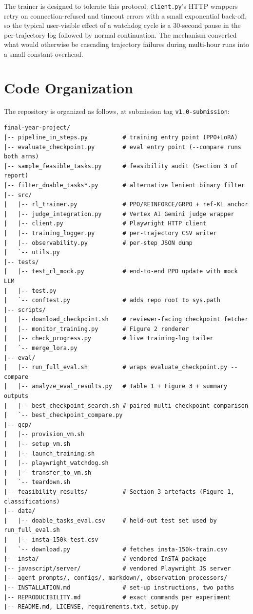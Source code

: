 \documentclass[12pt,a4paper]{report}
\begin{document}
The trainer is designed to tolerate this protocol: \texttt{client.py}'s HTTP wrappers retry on connection-refused and timeout errors with a small exponential back-off, so the typical user-visible effect of a watchdog cycle is a 30-second pause in the per-trajectory log followed by normal continuation. The mechanism converted what would otherwise be cascading trajectory failures during multi-hour runs into a small constant overhead.

\section{Code Organization}\label{sec:impl-code}

The repository is organized as follows, at submission tag \texttt{v1.0-submission}:

\begin{lstlisting}[basicstyle=\scriptsize\ttfamily]
final-year-project/
|-- pipeline_in_steps.py          # training entry point (PPO+LoRA)
|-- evaluate_checkpoint.py        # eval entry point (--compare runs both arms)
|-- sample_feasible_tasks.py      # feasibility audit (Section 3 of report)
|-- filter_doable_tasks*.py       # alternative lenient binary filter
|-- src/
|   |-- rl_trainer.py             # PPO/REINFORCE/GRPO + ref-KL anchor
|   |-- judge_integration.py      # Vertex AI Gemini judge wrapper
|   |-- client.py                 # Playwright HTTP client
|   |-- training_logger.py        # per-trajectory CSV writer
|   |-- observability.py          # per-step JSON dump
|   `-- utils.py
|-- tests/
|   |-- test_rl_mock.py           # end-to-end PPO update with mock LLM
|   |-- test.py
|   `-- conftest.py               # adds repo root to sys.path
|-- scripts/
|   |-- download_checkpoint.sh    # reviewer-facing checkpoint fetcher
|   |-- monitor_training.py       # Figure 2 renderer
|   |-- check_progress.py         # live training-log tailer
|   `-- merge_lora.py
|-- eval/
|   |-- run_full_eval.sh          # wraps evaluate_checkpoint.py --compare
|   |-- analyze_eval_results.py   # Table 1 + Figure 3 + summary outputs
|   |-- best_checkpoint_search.sh # paired multi-checkpoint comparison
|   `-- best_checkpoint_compare.py
|-- gcp/
|   |-- provision_vm.sh
|   |-- setup_vm.sh
|   |-- launch_training.sh
|   |-- playwright_watchdog.sh
|   |-- transfer_to_vm.sh
|   `-- teardown.sh
|-- feasibility_results/          # Section 3 artefacts (Figure 1, classifications)
|-- data/
|   |-- doable_tasks_eval.csv     # held-out test set used by run_full_eval.sh
|   |-- insta-150k-test.csv
|   `-- download.py               # fetches insta-150k-train.csv
|-- insta/                        # vendored InSTA package
|-- javascript/server/            # vendored Playwright JS server
|-- agent_prompts/, configs/, markdown/, observation_processors/
|-- INSTALLATION.md               # set-up instructions, two paths
|-- REPRODUCIBILITY.md            # exact commands per experiment
|-- README.md, LICENSE, requirements.txt, setup.py
\end{lstlisting}
\end{document}
